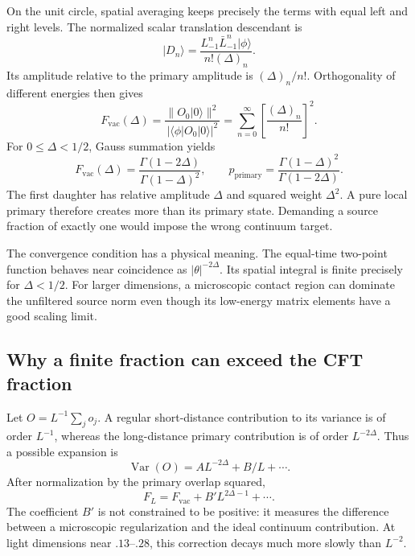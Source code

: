 On the unit circle, spatial averaging keeps precisely the terms with
equal left and right levels. The normalized scalar translation
descendant is
\[
 |D_n\rangle=
 \frac{L_{-1}^n\bar L_{-1}^n|\phi\rangle}{n!(\Delta)_n}.
\]
Its amplitude relative to the primary amplitude is $(\Delta)_n/n!$.
Orthogonality of different energies then gives
\begin{equation}
 F_{\mathrm{vac}}(\Delta)=
 \frac{\|O_0|0\rangle\|^2}{|\langle\phi|O_0|0\rangle|^2}
 =\sum_{n=0}^{\infty}\left[\frac{(\Delta)_n}{n!}\right]^2.
 \label{eq:vac-descendant-series}
\end{equation}
For $0\leq\Delta<1/2$, Gauss summation yields
\begin{equation}
 F_{\mathrm{vac}}(\Delta)
 =\frac{\Gamma(1-2\Delta)}{\Gamma(1-\Delta)^2},\qquad
 p_{\mathrm{primary}}=
 \frac{\Gamma(1-\Delta)^2}{\Gamma(1-2\Delta)}.
 \label{eq:primary-Gamma-fraction}
\end{equation}
The first daughter has relative amplitude $\Delta$ and squared weight
$\Delta^2$. A pure local primary therefore creates more than its
primary state. Demanding a source fraction of exactly one would impose
the wrong continuum target.

The convergence condition has a physical meaning. The equal-time
two-point function behaves near coincidence as $|\theta|^{-2\Delta}$.
Its spatial integral is finite precisely for $\Delta<1/2$. For larger
dimensions, a microscopic contact region can dominate the unfiltered
source norm even though its low-energy matrix elements have a good
scaling limit.

\subsection{Why a finite fraction can exceed the CFT fraction}

Let $O=L^{-1}\sum_jo_j$. A regular short-distance contribution to its
variance is of order $L^{-1}$, whereas the long-distance primary
contribution is of order $L^{-2\Delta}$. Thus a possible expansion is
\[
 \operatorname{Var}(O)=A L^{-2\Delta}+B/L+\cdots.
\]
After normalization by the primary overlap squared,
\begin{equation}
 F_L=F_{\mathrm{vac}}+B'L^{2\Delta-1}+\cdots.
 \label{eq:contact-correction}
\end{equation}
The coefficient $B'$ is not constrained to be positive: it measures
the difference between a microscopic regularization and the ideal
continuum contribution. At light dimensions near $.13$--$.28$, this
correction decays much more slowly than $L^{-2}$.

